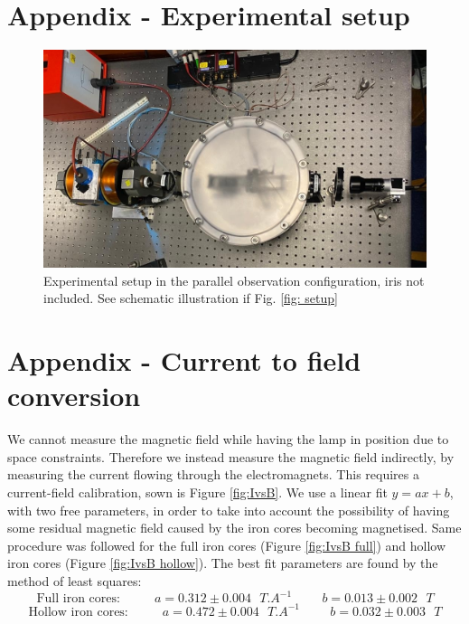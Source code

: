 \documentclass[11pt]{article}
\begin{document}
\section{Appendix - Experimental setup} \label{sec: app setup}
\begin{figure}[h!]
    \centering
    \includegraphics[width=0.65\linewidth]{setup photo.jpeg}
    \captionsetup{justification=centering}
    \caption{Experimental setup in the parallel observation configuration, iris not included. See schematic illustration if Fig. \ref{fig: setup}}
    \label{fig: setup photo}
\end{figure}

\section{Appendix - Current to field conversion}
We cannot measure the magnetic field while having the lamp in position due to space constraints. Therefore we instead measure the magnetic field indirectly, by measuring the current flowing through the electromagnets. This requires a current-field calibration, sown is Figure \ref{fig:IvsB}. We use a linear fit $y = a x + b$, with two free parameters, in order to take into account the possibility of having some residual magnetic field caused by the iron cores becoming magnetised. Same procedure was followed for the full iron cores (Figure \ref{fig:IvsB full}) and hollow iron cores (Figure \ref{fig:IvsB hollow}). The best fit parameters are found by the method of least squares: 
\begin{equation}
	\text{Full iron cores: }
	\hspace {1cm} 
	a = 0.312 \pm 0.004  \text{ } \si{T.A^{-1}} 
	\hspace {1cm} 
	b = 0.013 \pm 0.002 \text{ }  \si{T} 
\end{equation}
\begin{equation}
	\text{Hollow iron cores: }
	\hspace {1cm} 
	a = 0.472 \pm 0.004  \text{ } \si{T.A^{-1}} 
	\hspace {1cm} 
	b = 0.032 \pm 0.003  \text{ } \si{T} 
\end{equation}
\end{document}
